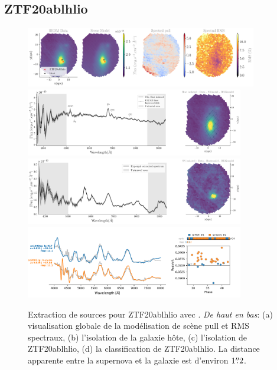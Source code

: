 \documentclass[../main/main.tex]{subfiles}
\begin{document}
\subsection{ZTF20ablhlio}
\begin{figure}[ht]
  \centering
  \includegraphics[width=0.9\textwidth]{../figures/07_scene/scene_rmspull_ZTF20ablhlio.png}
  \includegraphics[width=0.85\textwidth]{../figures/07_scene/output_host_ZTF20ablhlio.png}
  \includegraphics[width=0.85\textwidth]{../figures/07_scene/output_target_ZTF20ablhlio.png}
  \includegraphics[width=0.85\textwidth]{../figures/07_scene/ZTF20ablhlio_snid_typing.pdf}
  \caption[Extraction de sources pour ZTF19acbjlnt.]{Extraction de
    sources pour ZTF20ablhlio avec \hypergal. \emph{De haut en bas}:
    (a) visualisation globale de la modélisation de scène pull et RMS
    spectraux, (b) l'isolation de la galaxie hôte, (c) l'isolation de
    ZTF20ablhlio, (d) la classification de ZTF20ablhlio. La distance apparente entre la
supernova et la galaxie est d'environ $1\overset{\prime\prime}{.}2$.}
  \label{}
\end{figure}

\restoregeometry



\end{document}
